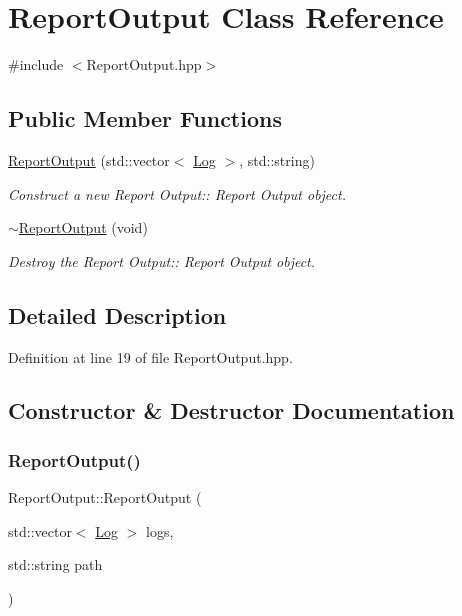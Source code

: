 \hypertarget{class_report_output}{}\section{Report\+Output Class Reference}
\label{class_report_output}


{\ttfamily \#include $<$Report\+Output.\+hpp$>$}

\subsection*{Public Member Functions}
\begin{DoxyCompactItemize}
\item 
\hyperlink{class_report_output_a20eb1ca7f8442fd2402f112899f6cfee}{Report\+Output} (std\+::vector$<$ \hyperlink{class_log}{Log} $>$, std\+::string)
\begin{DoxyCompactList}\small\item\em Construct a new Report Output\+:\+: Report Output object. \end{DoxyCompactList}\item 
\hyperlink{class_report_output_a6f255eea899e24768b5220ebe960ad6d}{$\sim$\+Report\+Output} (void)
\begin{DoxyCompactList}\small\item\em Destroy the Report Output\+:\+: Report Output object. \end{DoxyCompactList}\end{DoxyCompactItemize}


\subsection{Detailed Description}


Definition at line 19 of file Report\+Output.\+hpp.



\subsection{Constructor \& Destructor Documentation}
\mbox{\label{class_report_output_a20eb1ca7f8442fd2402f112899f6cfee}} 
\subsubsection{\texorpdfstring{Report\+Output()}{ReportOutput()}}
{\footnotesize\ttfamily Report\+Output\+::\+Report\+Output (\begin{DoxyParamCaption}\item[{std\+::vector$<$ \hyperlink{class_log}{Log} $>$}]{logs,  }\item[{std\+::string}]{path }\end{DoxyParamCaption})}



